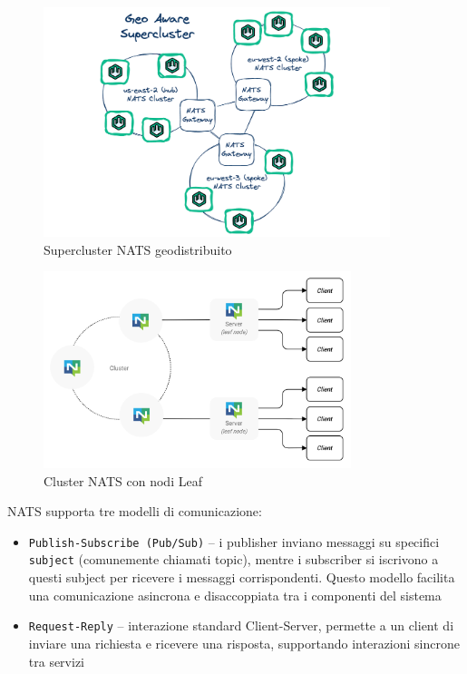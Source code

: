\FloatBarrier
\begin{figure}[h]
    \centering
    \includegraphics[width=0.9\textwidth]{img/nats-supercluster.png}
    \caption{Supercluster NATS geodistribuito\protect\footnotemark}
    \label{fig:nats_supercluster}
\end{figure}
\FloatBarrier


\FloatBarrier
\begin{figure}[ht]
    \centering
    \includegraphics[width=0.8\textwidth]{img/nats-leaf.png}
    \caption{Cluster NATS con nodi Leaf\protect\footnotemark}
    \label{fig:nats_leaf}
\end{figure}
\FloatBarrier


NATS supporta tre modelli di comunicazione:
\begin{itemize}
    \item \texttt{Publish-Subscribe (Pub/Sub)} -- i publisher inviano messaggi su specifici \texttt{subject} (comunemente chiamati topic), mentre i subscriber si iscrivono a questi subject per ricevere i messaggi corrispondenti. Questo modello facilita una comunicazione asincrona e disaccoppiata tra i componenti del sistema 
    
    \item \texttt{Request-Reply} -- interazione standard Client-Server, permette a un client di inviare una richiesta e ricevere una risposta, supportando interazioni sincrone tra servizi
    
\end{itemize}

